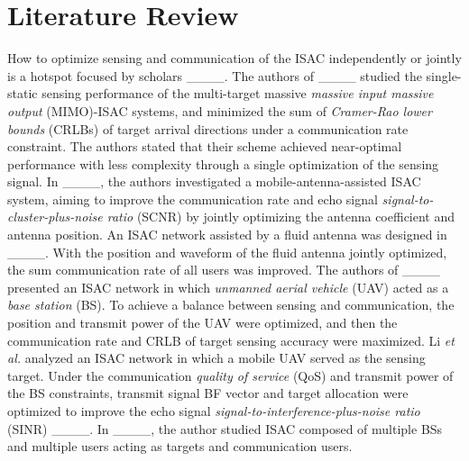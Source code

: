 \section{Literature Review}
How to optimize sensing and communication of the ISAC independently or jointly is a hotspot focused by scholars ____. The authors of ____ studied the single-static sensing performance of the multi-target massive \emph{massive input massive output} (MIMO)-ISAC systems, and minimized the sum of \emph{Cramer-Rao lower bounds} (CRLBs) of target arrival directions under a communication rate constraint. The authors stated that their scheme achieved near-optimal
performance with less complexity through a single optimization of the sensing signal.
In ____, the authors investigated a mobile-antenna-assisted ISAC system, aiming to improve the communication rate and echo signal \emph{signal-to-cluster-plus-noise ratio} (SCNR) by jointly optimizing the antenna coefficient and antenna position. An ISAC network assisted by a fluid antenna was designed in ____. With the position and waveform of the fluid antenna jointly optimized, the sum communication rate of all users was improved. The authors of ____ presented an ISAC network in which \emph{unmanned aerial vehicle} (UAV) acted as a \emph{base station} (BS). To achieve a balance between sensing and communication, the position and transmit power of the UAV were optimized, and then the communication rate and CRLB of target sensing accuracy were maximized. %
Li \emph{et al.} analyzed an ISAC network in which a mobile UAV served as the sensing target. Under the communication \emph{quality of service} (QoS) and transmit power of the BS constraints, transmit signal BF vector and target allocation were optimized to improve the echo signal \emph{signal-to-interference-plus-noise ratio} (SINR) ____. In ____, the author studied ISAC composed of multiple BSs and multiple users acting as targets and communication users. %

